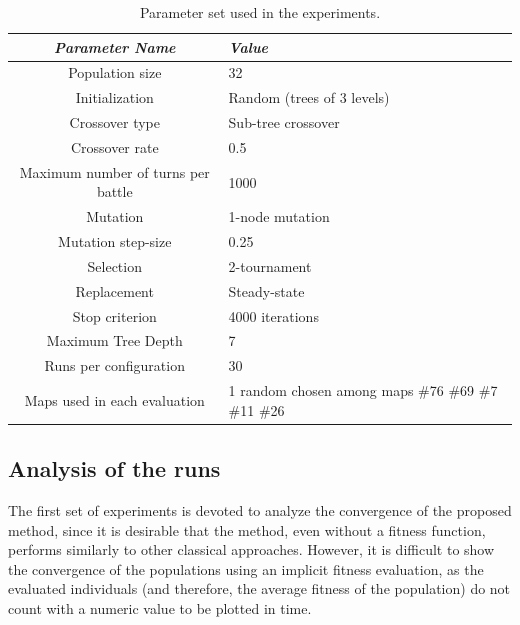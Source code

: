 \documentclass[conference]{IEEEtran}
\begin{document}
\begin{table}
\begin{center}
\begin{tabular}{|c|p{2.5cm}|}
\hline
{\em Parameter Name} & {\em Value} \\\hline \hline
Population size & 32 \\\hline
Initialization & Random (trees of 3 levels)\\ \hline
Crossover type & Sub-tree crossover \\ \hline
Crossover rate & 0.5\\ \hline
Maximum number of turns per battle & 1000 \\\hline
Mutation  & 1-node mutation\\ \hline
Mutation step-size & 0.25 \\ \hline
Selection & 2-tournament \\ \hline
Replacement & Steady-state\\ \hline
Stop criterion & 4000 iterations \\ \hline
Maximum Tree Depth & 7  \\ \hline

Runs per configuration & 30 \\ \hline
Maps used in each evaluation & 1 random chosen among maps \#76 \#69 \#7 \#11 \#26\\ \hline
\end{tabular}
\caption{Parameter set used in the experiments.}     %
\label{tab:parameters}
\end{center}
\end{table}


\subsection{Analysis of the runs}   %
\label{subsec:analysisexecutions}

The first set of experiments is devoted to analyze the convergence of the proposed method, since it is desirable that the method, even without a fitness function, performs similarly to other classical approaches.
However, it is difficult to show the convergence of the populations using an implicit fitness evaluation, as the evaluated individuals (and therefore, the average fitness of the population) do not count with a numeric value to be plotted in time. 
\end{document}
